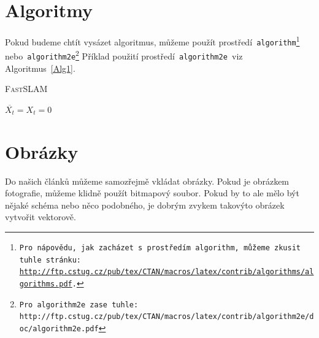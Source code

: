 \documentclass[a4paper, 11pt]{article}
\begin{document}
\section{Algoritmy}
	\label{pg3}

Pokud budeme chtít vysázet algoritmus, můžeme použít prostředí\texttt{ algorithm\footnote{
	Pro nápovědu, jak zacházet s~prostředím\texttt{ algorithm,} můžeme zkusit tuhle stránku: \\
	\url{http://ftp.cstug.cz/pub/tex/CTAN/macros/latex/contrib/algorithms/algorithms.pdf}.}}
nebo\texttt{ algorithm2e\footnote{
	Pro\texttt{ algorithm2e }zase tuhle: http://ftp.cstug.cz/pub/tex/CTAN/macros/latex/contrib/algorithm2e/doc/algorithm2e.pdf}}
Příklad použití prostředí\texttt{ algorithm2e }viz Algoritmus~\ref{Alg1}. \\
\IncMargin{1.5em}
\begin{algorithm}
\label{Alg1}
\caption{\textsc{FastSLAM}}
	

	\SetNlSty{}{}{:}
	\SetNlSkip{0.4em}

	\Indm\Indmm
	\Indp\Indpp
	\BlankLine

	$ \overline{X_t} = X_t = 0 $ \\



\end{algorithm}
\DecMargin{1.5em}
\section{Obrázky}
Do našich článků můžeme samozřejmě vkládat obrázky. Pokud je obrázkem fotografie, můžeme klidně použít
bitmapový soubor. Pokud by to ale mělo být nějaké schéma nebo něco podobného, je dobrým zvykem takovýto
obrázek vytvořit vektorově.
\end{document}
